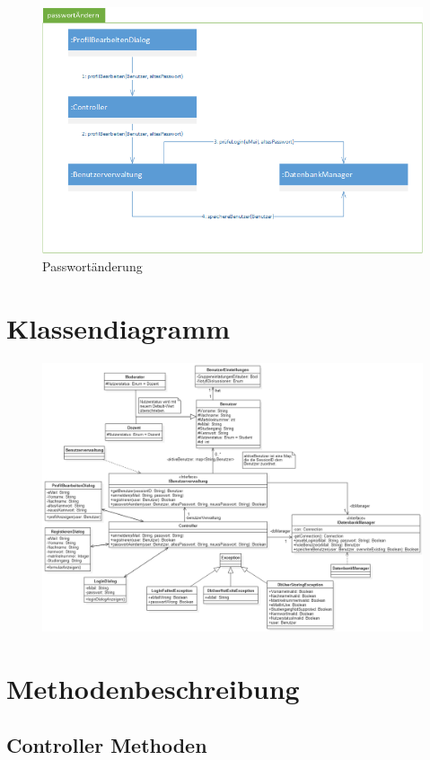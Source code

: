 \documentclass[12pt]{scrreprt}
\begin{document}
\begin{figure}[H]
\centering
\includegraphics[width=0.7\linewidth]{Bilder/Kommunikationsdiagramme/passwortAendern}
\caption{Passwortänderung}
\label{Passwortaenderung}
\end{figure}


\section{Klassendiagramm}

\begin{figure}[H]
\centering
\includegraphics[width=\textwidth]{Bilder/Klassendiagramm/Klassendiagramm}
\caption{}
\label{fig:Klassendiagramm}
\end{figure}


\section{Methodenbeschreibung}
\subsection{Controller Methoden}
\end{document}

